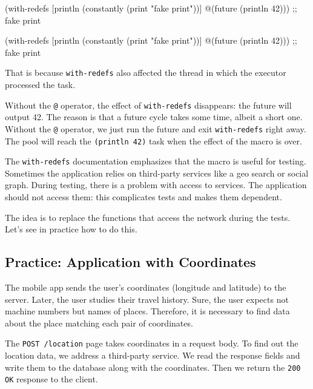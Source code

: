 \begin{english}
  \begin{clojure}
(with-redefs
  [println (constantly
             (print "fake print"))]
  @(future (println 42)))
;; fake print
  \end{clojure}
\end{english}

\else

\begin{english}
  \begin{clojure}
(with-redefs
  [println (constantly (print "fake print"))]
  @(future (println 42)))
;; fake print
  \end{clojure}
\end{english}

\fi

That is because \verb|with-redefs| also affected the thread in which the executor processed the task.

\mnoindent
Without the \verb|@| operator, the effect of \verb|with-redefs| disappears: the future will output 42. The reason is that a future cycle takes some time, albeit a short one.
Without the \verb|@| operator, we just run the future and exit \verb|with-redefs| right away.
The pool will reach the \verb|(println 42)| task when the effect of the macro is over.

The \verb|with-redefs| documentation emphasizes that the macro is useful for testing.
Sometimes the application relies on third-party services like a geo search or social graph.
During testing, there is a problem with access to services. 
The application should not access them: this complicates tests and makes them dependent.

The idea is to replace the functions that access the network during the tests.
Let's see in practice how to do this.

\subsection{Practice: Application with Coordinates}


The mobile app sends the user's coordinates (longitude and latitude) to the server.
Later, the user studies their travel history.
Sure, the user expects not machine numbers but names of places.
Therefore, it is necessary to find data about the place matching each pair of coordinates.

The \verb|POST /location| page takes coordinates in a request body. To find out the location data, we address a third-party service. We read the response fields and write them to the database along with the coordinates. Then we return the \verb|200 OK| response to the client.

